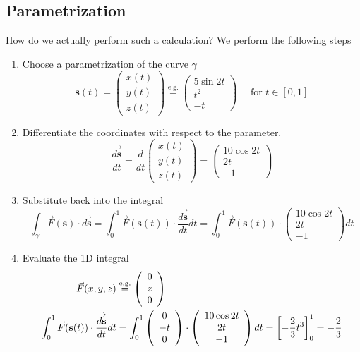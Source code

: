 \documentclass{article}
\begin{document}
\subsection{Parametrization}
How do we actually perform such a calculation? We perform the following steps 
\begin{enumerate}
    \item Choose a parametrization of the curve $\gamma$
    $$\mathbf{s}(t) = \left(\begin{array}{l}
         x(t) \\
         y(t) \\
         z(t) 
    \end{array}\right) \stackrel{\text{e.g.}}{=} \left(\begin{array}{c}
         5 \sin 2t\\ t^2\\ -t
    \end{array}\right) \quad \text{ for } t \in [0,1]$$
    \item Differentiate the coordinates with respect to the parameter.
    $$\frac{\overrightarrow{d\mathbf{s}}}{dt} = \frac{d}{dt} \left(\begin{array}{c}
         x(t) \\
         y(t) \\
         z(t) 
    \end{array}\right) = \left(\begin{array}{c}
         10 \cos 2t\\ 2t\\ -1
    \end{array}\right)$$
    \item Substitute back into the integral
    $$\int_\gamma \vec{F}(\mathbf{s}) \cdot \overrightarrow{d\mathbf{s}} = \int_0^1 \vec{F}(\mathbf{s}(t)) \cdot \frac{\overrightarrow{d\mathbf{s}}}{dt} dt = \int_0^1 \vec{F}(\mathbf{s}(t)) \cdot \left(\begin{array}{c}
         10 \cos 2t\\ 2t\\ -1
    \end{array}\right) dt$$
    \item Evaluate the 1D integral 
    \begin{align}
    \vec{F}(x,y,z) &\stackrel{\text{e.g.}}{=} \left(\begin{array}{c}
         0 \\ z \\ 0
    \end{array}\right) \\
    \int_0^1 \vec{F}(\mathbf{s}(t)) \cdot \frac{\overrightarrow{d\mathbf{s}}}{dt} dt &= \int_0^1 \left(\begin{array}{c}
         0 \\ -t \\ 0
    \end{array}\right) \cdot \left(\begin{array}{c}
         10 \cos 2t\\ 2t\\ -1
    \end{array}\right) dt = \left[-\frac{2}{3} t^3\right]^1_0 = -\frac{2}{3} \notag
    \end{align}
\end{enumerate}
\end{document}
